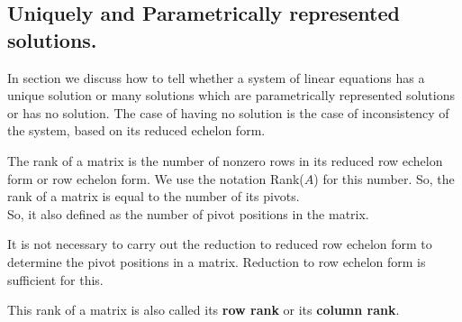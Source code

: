 \documentclass[math101_lecturenotes_ku.tex]{subfiles}
\begin{document}
\subsection{Uniquely and Parametrically represented solutions.}
In section we discuss how to tell whether a system of linear equations has a unique solution or many solutions which are parametrically represented solutions or has no solution. The case of having no solution is the case of inconsistency of the system, based on its reduced echelon form.

\begin{mdframed}
\begin{definition}
The rank of a matrix is the number of nonzero rows in its reduced row echelon form or row echelon form. We use the notation Rank($A$) for this number. So, the rank of a matrix is equal to the number of its pivots. \\[3mm]

So, it also defined as the number of pivot positions in the matrix.
\end{definition}
\end{mdframed}

\begin{remark}
  It is not necessary to carry out the reduction to reduced row echelon form to determine the pivot positions in a matrix. Reduction to row echelon form is sufficient for this.
\end{remark}

\begin{remark}
  This rank of a matrix is also called its \textbf{row rank} or its \textbf{column rank}.
\end{remark}
\end{document}
